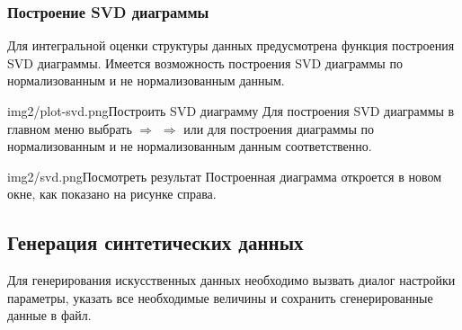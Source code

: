 \documentclass[12pt,tikz]{instruction}
\begin{document}
\newpage
\subsubsection{Построение SVD диаграммы}
\label{subsubsec:svd}
Для интегральной оценки структуры данных предусмотрена функция построения SVD диаграммы. Имеется возможность построения SVD диаграммы по нормализованным и не нормализованным данным.
\begin{steps}
	\begin{ist}{img2/plot-svd.png}{Построить SVD диаграмму}
		Для построения SVD диаграммы в главном меню выбрать  $\Rightarrow$  $\Rightarrow$  или  для построения диаграммы по нормализованным и не нормализованным данным соответственно.
	\end{ist}

	\begin{ist}{img2/svd.png}{Посмотреть результат}
		Построенная диаграмма откроется в новом окне, как показано на рисунке справа.\vspace{6.5cm}
	\end{ist}
\end{steps}

\subsection{Генерация синтетических данных}
\label{subsec:generation}
Для генерирования искусственных данных необходимо вызвать диалог настройки параметры, указать все необходимые величины и сохранить сгенерированные данные в файл.
\end{document}
